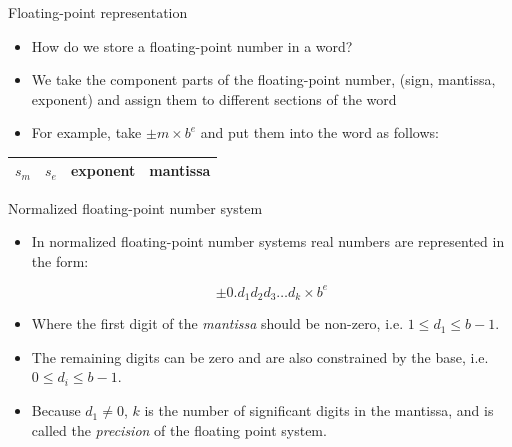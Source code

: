 \documentclass[12pt]{beamer}
\begin{document}
\begin{frame}{Floating-point representation} 
\begin{itemize}

\item{How do we store a floating-point number in a word?}
\item{We take the component parts of the floating-point number, (sign, mantissa, exponent) and assign them to different sections of the word}
\item{For example, take $\pm m \times b ^ e$ and put them into the word as follows:} 
\end{itemize}

\begin{center}
\begin{tabular}{ |c|c|c|c| } 
 \hline
 $s_m$ & $s_e$ & exponent & \hspace{0.25 in} mantissa \hspace{0.25 in} \\ 
 \hline
\end{tabular}
\end{center}
\vspace{1 in}
\end{frame}


\begin{frame}{Normalized floating-point number system} 
\begin{itemize}

\item{In normalized floating-point number systems real numbers are represented in the form: 

\begin{equation} 
\pm 0.d_1d_2d_3 \dots d_k \times b ^ e 
\end{equation}}

\item{Where the first digit of the {\it mantissa} should be non-zero, i.e. $ 1
\leq d_1 \leq b-1$.} 
\item{The remaining digits can be zero and are also
constrained by the base, i.e. $ 0 \leq d_i \leq b-1$.}

\item{Because $d_1 \neq 0$, $k$ is the number of significant digits in the mantissa, and is called
the {\it precision} of the floating point system.} 

\end{itemize}
\end{frame}
\end{document}
